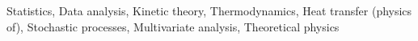 \documentclass[]{article}
\begin{document}
Statistics, Data analysis, Kinetic theory, Thermodynamics, Heat transfer (physics of), Stochastic processes, Multivariate analysis, Theoretical physics
\end{document}
